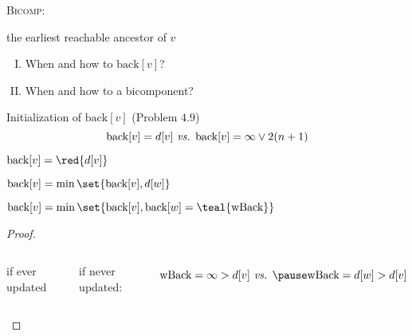 
\begin{frame}
  \centerline{\Large \textsc{Bicomp}: }

  \pause
  \begin{center}
    
  \end{center}
\end{frame}

\begin{frame}
  \centerline{ the earliest reachable ancestor of $v$} %

  \vspace{0.30cm}
  \begin{enumerate}[(I)]
    \centering
    \item When and how to  $\text{back}[v]$? \\[6pt]
    \item When and how to  a bicomponent?
  \end{enumerate}

  \pause
\end{frame}

\begin{frame}
  \begin{exampleblock}{Initialization of $\text{back}[v]$ (Problem $4.9$)}
    \[
      \text{back}[v] = d[v] \text{\emph{ vs. }} \text{back}[v] = \infty \lor 2(n+1) 
    \]
  \end{exampleblock}

  \pause
  \vspace{0.30cm}
  \begin{description}
    \item[tree edge ($\to v$):]   $\text{back}[v] = \red{d[v]}$
    \item[back edge ($v \to w$):] $\text{back}[v] = \min \set{\text{back}[v], d[w]}$
    \item[backtracking from $w$:] $\text{back}[v] = \min \set{\text{back}[v], \text{back}[w] = \teal{\text{wBack}}}$
  \end{description}

  \pause
  \begin{proof}
    \begin{columns}
	\centerline{if ever updated}
	\pause
	\centerline{if never updated:}
	\pause
	\[
	  \text{wBack} = \infty > d[v] \text{\emph{ vs. }} \pause \text{wBack} = d[w] > d[v]
	\]
    \end{columns}
    \vspace{-0.50cm}
  \end{proof}
\end{frame}

